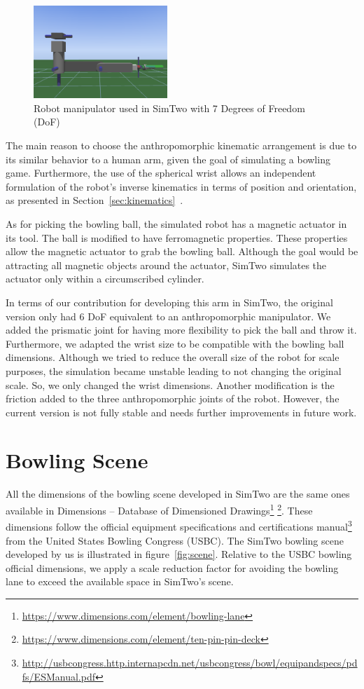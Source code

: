 \documentclass[10pt,a4paper,notitlepage,twocolumn,twoside]{article}
\begin{document}
\begin{figure}[!t]
  \centering
  \includegraphics[width=0.45\textwidth]{images/manipulator-7dof.png}
  \caption{Robot manipulator used in SimTwo with 7 Degrees of Freedom (DoF)}
  \label{fig:robot}
\end{figure}

The main reason to choose the anthropomorphic kinematic arrangement is due to its similar behavior to a human arm, given the goal of simulating a bowling game. Furthermore, the use of the spherical wrist allows an independent formulation of the robot's inverse kinematics in terms of position and orientation, as presented in Section~\ref{sec:kinematics}~\cite{book:spong:2005}.

As for picking the bowling ball, the simulated robot has a magnetic actuator in its tool. The ball is modified to have ferromagnetic properties. These properties allow the magnetic actuator to grab the bowling ball. Although the goal would be attracting all magnetic objects around the actuator, SimTwo simulates the actuator only within a circumscribed cylinder.

In terms of our contribution for developing this arm in SimTwo, the original version only had 6 DoF equivalent to an anthropomorphic manipulator. We added the prismatic joint for having more flexibility to pick the ball and throw it. Furthermore, we adapted the wrist size to be compatible with the bowling ball dimensions. Although we tried to reduce the overall size of the robot for scale purposes, the simulation became unstable leading to not changing the original scale. So, we only changed the wrist dimensions. Another modification is the friction added to the three anthropomorphic joints of the robot. However, the current version is not fully stable and needs further improvements in future work.

\section{Bowling Scene}
\label{sec:scene}

All the dimensions of the bowling scene developed in SimTwo are the same ones available in Dimensions -- Database of Dimensioned Drawings\footnote{\url{https://www.dimensions.com/element/bowling-lane}} \footnote{\url{https://www.dimensions.com/element/ten-pin-pin-deck}}. These dimensions follow the official equipment specifications and certifications manual\footnote{\url{http://usbcongress.http.internapcdn.net/usbcongress/bowl/equipandspecs/pdfs/ESManual.pdf}} from the United States Bowling Congress (USBC). The SimTwo bowling scene developed by us is illustrated in figure~\ref{fig:scene}. Relative to the USBC bowling official dimensions, we apply a scale reduction factor for avoiding the bowling lane to exceed the available space in SimTwo's scene.
\end{document}
